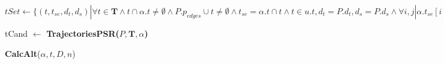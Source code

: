 \begin{algorithm}
{ 	$tSet \leftarrow \{(t, t_{se}, d_t, d_s) | \forall t \in \mathbf{T} \wedge t \cap \alpha.t \neq \emptyset \wedge P.p_{edges} \cup t \neq \emptyset \wedge t_{se} = \alpha.t \cap t \wedge t \in u.t, d_t = P.d_t, d_s = P.d_s \wedge \forall i,j | \alpha.t_{se}[i]_{\tau_{s}}-\frac{\alpha.d_t}{2} \leq t_{se}[j]_{\tau_{s}} \leq \alpha.t_{se}[i]_{\tau_{s}}+\frac{\alpha.d_t}{2} \}$

}

{
	{
		tCand $\leftarrow$ {\bf TrajectoriesPSR($P, \mathbf{T}, \alpha$)} \;

 		{
			{\bf CalcAlt}($\alpha, t, D, n$) \;
 		}
	}

	 \;
}

\caption{Calculate Candidates}
\label{alg:calcCan}
\end{algorithm}